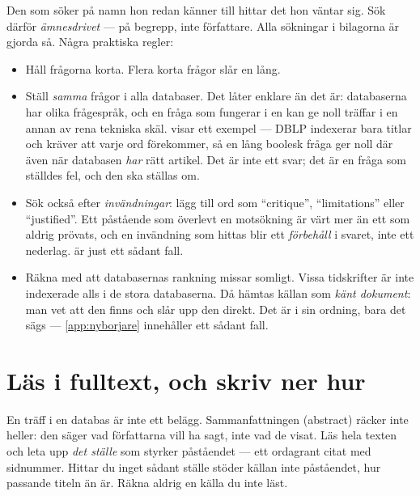 Den som söker på namn hon redan känner till hittar det hon väntar sig.
Sök därför \emph{ämnesdrivet} --- på begrepp, inte författare.  Alla
sökningar i bilagorna är gjorda så.  Några praktiska regler:
\begin{itemize}
  \item Håll frågorna korta.  Flera korta frågor slår en lång.
  \item Ställ \emph{samma} frågor i alla databaser.  Det låter enklare
    än det är: databaserna har olika frågespråk, och en fråga som
    fungerar i en kan ge noll träffar i en annan av rena tekniska skäl.
     visar ett exempel --- DBLP indexerar bara
    titlar och kräver att varje ord förekommer, så en lång boolesk
    fråga ger noll där även när databasen \emph{har} rätt artikel.  Det
    är inte ett svar; det är en fråga som ställdes fel, och den ska
    ställas om.
  \item Sök också efter \emph{invändningar}: lägg till ord som
    \enquote{critique}, \enquote{limitations} eller \enquote{justified}.
    Ett påstående som överlevt en motsökning är värt mer än ett som
    aldrig prövats, och en invändning som hittas blir ett
    \emph{förbehåll} i svaret, inte ett nederlag.  
    är just ett sådant fall.
  \item Räkna med att databasernas rankning missar somligt.  Vissa
    tidskrifter är inte indexerade alls i de stora databaserna.  Då
    hämtas källan som \emph{känt dokument}: man vet att den finns och
    slår upp den direkt.  Det är i sin ordning, bara det sägs ---
    \cref{app:nyborjare} innehåller ett sådant fall.
\end{itemize}

\section{Läs i fulltext, och skriv ner hur}

En träff i en databas är inte ett belägg.  Sammanfattningen
(\foreignlanguage{english}{abstract}) räcker inte heller: den säger vad
författarna vill ha sagt, inte vad de visat.  Läs hela texten och leta
upp \emph{det ställe} som styrker påståendet --- ett ordagrant citat med
sidnummer.  Hittar du inget sådant ställe stöder källan inte påståendet,
hur passande titeln än är.  Räkna aldrig en källa du inte läst.

